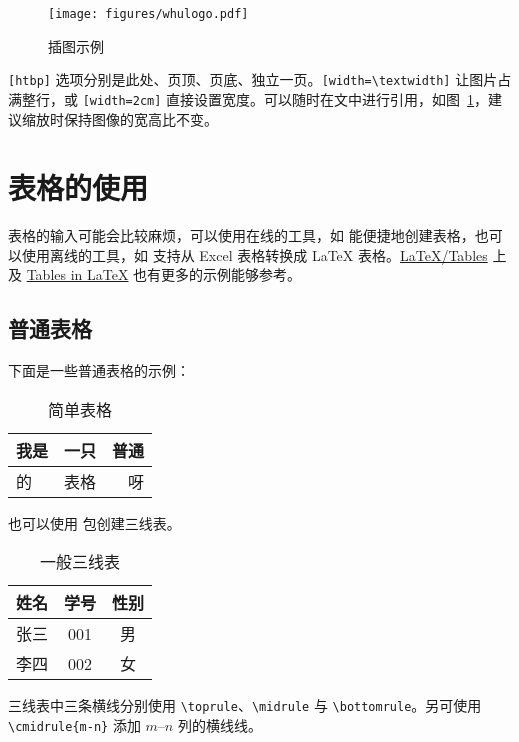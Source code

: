 \begin{figure}[!htb]
  \centering
  \texttt{[image: figures/whulogo.pdf]}
  \caption{插图示例}
  \label{fig:whu}
\end{figure}

\verb|[htbp]| 选项分别是此处、页顶、页底、独立一页。\verb|[width=\textwidth]| 让图片占满整行，或 \verb|[width=2cm]| 直接设置宽度。可以随时在文中进行引用，如图~\ref{fig:whu}，建议缩放时保持图像的宽高比不变。

\section{表格的使用}
表格的输入可能会比较麻烦，可以使用在线的工具，如 \href{https://www.tablesgenerator.com/}{} 能便捷地创建表格，也可以使用离线的工具，如 \href{https://ctan.org/pkg/excel2latex}{} 支持从 Excel 表格转换成 \LaTeX{} 表格。\href{https://en.wikibooks.org/wiki/LaTeX/Tables}{LaTeX/Tables} 上及 \href{https://www.tug.org/pracjourn/2007-1/mori/mori.pdf}{Tables in LaTeX} 也有更多的示例能够参考。

\subsection{普通表格}
下面是一些普通表格的示例：

\begin{table}[ht]
  \centering
  \caption{简单表格}
  \label{tab:1}
  \begin{tabular}{|l|c|r|}
    \hline
    我是 & 一只 & 普通 \\
    \hline
    的   & 表格 & 呀   \\
    \hline
  \end{tabular}
\end{table}

也可以使用  包创建三线表。

\begin{table}[ht]
  \centering
  \caption{一般三线表}
  \label{tab:2}
  \begin{tabular}{ccc}
    \toprule
    姓名 & 学号 & 性别 \\
    \midrule
    张三 & 001  & 男   \\
    李四 & 002  & 女   \\
    \bottomrule
  \end{tabular}
\end{table}

三线表中三条横线分别使用 \verb|\toprule|、\verb|\midrule| 与 \verb|\bottomrule|。另可使用 \verb|\cmidrule{m-n}| 添加 \(m\)--\(n\) 列的横线线。

